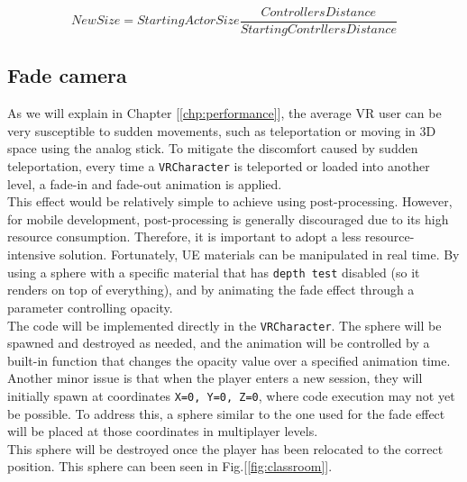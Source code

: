 \begin{equation}
    \label{math:ratio}
    New Size=Starting Actor Size \frac{Controllers Distance}{Starting Contrllers Distance}
\end{equation}

\subsection{Fade camera}
\noindent
As we will explain in Chapter [\ref{chp:performance}], the average \ac{VR} user can be very susceptible to sudden movements, such as teleportation or moving in 3D space using the analog stick.
To mitigate the discomfort caused by sudden teleportation, every time a \texttt{VRCharacter} is teleported or loaded into another level, a fade-in and fade-out animation is applied.\\
This effect would be relatively simple to achieve using post-processing. However, for mobile development, post-processing is generally discouraged due to its high resource consumption. Therefore, it is important to adopt a less resource-intensive solution. Fortunately, \ac{UE} materials can be manipulated in real time.
By using a sphere with a specific material that has \texttt{depth test} disabled (so it renders on top of everything), and by animating the fade effect through a parameter controlling opacity.\\
The code will be implemented directly in the \texttt{VRCharacter}. The sphere will be spawned and destroyed as needed, and the animation will be controlled by a built-in function that changes the opacity value over a specified animation time.\\
Another minor issue is that when the player enters a new session, they will initially spawn at coordinates \texttt{X=0, Y=0, Z=0}, where code execution may not yet be possible. To address this, a sphere similar to the one used for the fade effect will be placed at those coordinates in multiplayer levels.\\
This sphere will be destroyed once the player has been relocated to the correct position. This sphere can been seen in Fig.[\ref{fig:classroom}].



